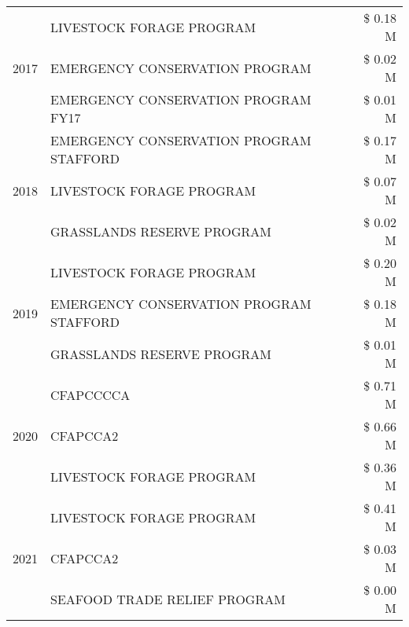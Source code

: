 \begin{tabular}{llr}
\cline{1-3}
\multirow[t]{3}{*}{2017} & LIVESTOCK FORAGE PROGRAM & \$ 0.18 M \\
 & EMERGENCY CONSERVATION PROGRAM & \$ 0.02 M \\
 & EMERGENCY CONSERVATION PROGRAM FY17 & \$ 0.01 M \\
\cline{1-3}
\multirow[t]{3}{*}{2018} & EMERGENCY CONSERVATION PROGRAM STAFFORD & \$ 0.17 M \\
 & LIVESTOCK FORAGE PROGRAM & \$ 0.07 M \\
 & GRASSLANDS RESERVE PROGRAM & \$ 0.02 M \\
\cline{1-3}
\multirow[t]{3}{*}{2019} & LIVESTOCK FORAGE PROGRAM & \$ 0.20 M \\
 & EMERGENCY CONSERVATION PROGRAM STAFFORD & \$ 0.18 M \\
 & GRASSLANDS RESERVE PROGRAM & \$ 0.01 M \\
\cline{1-3}
\multirow[t]{3}{*}{2020} & CFAPCCCCA & \$ 0.71 M \\
 & CFAPCCA2 & \$ 0.66 M \\
 & LIVESTOCK FORAGE PROGRAM & \$ 0.36 M \\
\cline{1-3}
\multirow[t]{3}{*}{2021} & LIVESTOCK FORAGE PROGRAM & \$ 0.41 M \\
 & CFAPCCA2 & \$ 0.03 M \\
 & SEAFOOD TRADE RELIEF PROGRAM & \$ 0.00 M \\
\cline{1-3}
\bottomrule
\end{tabular}

